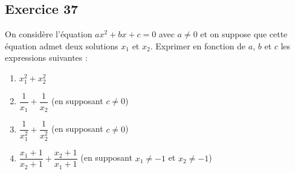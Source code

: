 \documentclass[11pt,a4paper]{article}
\begin{document}
\subsection*{Exercice 37}
On considère l'équation $ax^2 + bx + c = 0$ avec $a \neq 0$ et on suppose que cette équation admet deux solutions $x_1$ et $x_2$.
Exprimer en fonction de $a$, $b$ et $c$ les expressions suivantes :
\begin{enumerate}
    \item $x_1^2 + x_2^2$
    \item $\dfrac{1}{x_1} + \dfrac{1}{x_2}$ \quad (en supposant $c \neq 0$)
    \item $\dfrac{1}{x_1^2} + \dfrac{1}{x_2^2}$ \quad (en supposant $c \neq 0$)
    \item $\dfrac{x_1 + 1}{x_2 + 1} + \dfrac{x_2 + 1}{x_1 + 1}$ \quad (en supposant $x_1 \neq -1$ et $x_2 \neq -1$)
\end{enumerate}
\end{document}

